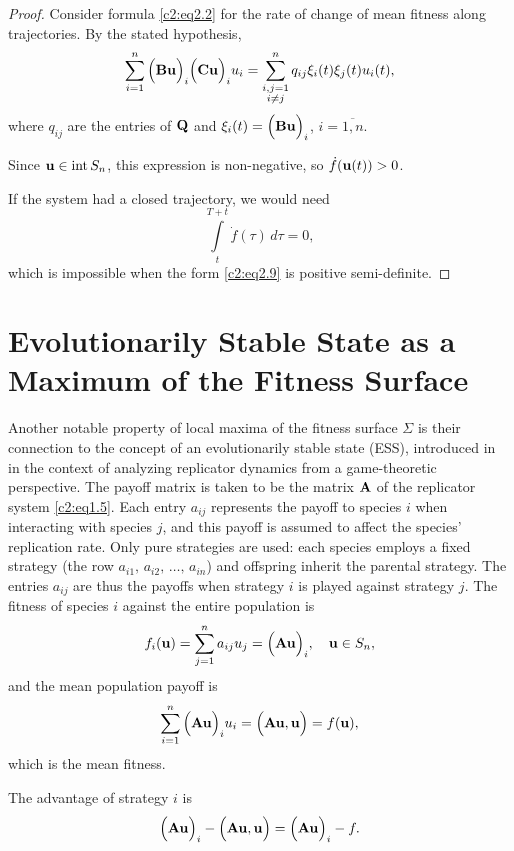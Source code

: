 \documentclass[12pt]{report}
\newcommand{\inside}{\mathrm{int}\,}
\theoremstyle{definition}
\theoremstyle{remark}
\begin{document}
\begin{proof}
	Consider formula \eqref{c2:eq2.2} for the rate of change of mean fitness along trajectories. By the stated hypothesis,
	\begin{equation}
		\label{c2:eq2.9}
		\sum\limits_{i = 1}^{n}\Big({\bf Bu}\Big)_{i}\Big({\bf Cu}\Big)_{i} u_i = \sum\limits_{\substack{i,j = 1 \\ i \neq j}}^{n}q_{ij}\xi_{i}(t)\xi_{j}(t)u_{i}(t),
	\end{equation}
	where $q_{ij}$ are the entries of ${\bf Q}$ and $\xi_{i}(t) = \Big({\bf Bu}\Big)_{i}$, $i = \overline{1, n}$.
	
	Since ${\bf u} \in \inside S_{n}$, this expression is non-negative, so $\dot{f}({\bf u}(t)) > 0$.
	
	If the system had a closed trajectory, we would need
	$$
	\int\limits_{t}^{T + t}\dot{f}(\tau)\,d\tau = 0,
	$$  
	which is impossible when the form \eqref{c2:eq2.9} is positive semi-definite. 
\end{proof} 

\clearpage

\section{Evolutionarily Stable State as a Maximum of the Fitness Surface}\label{c2:section:2.4}
Another notable property of local maxima of the fitness surface $\Sigma$ is their connection to the concept of an evolutionarily stable state (ESS), introduced in~\cite{c2:Maynard1982} in the context of analyzing replicator dynamics from a game-theoretic perspective. The payoff matrix is taken to be the matrix ${\bf A}$ of the replicator system \eqref{c2:eq1.5}. Each entry $a_{ij}$ represents the payoff to species $i$ when interacting with species $j$, and this payoff is assumed to affect the species' replication rate. Only pure strategies are used: each species employs a fixed strategy (the row $a_{i1},\, a_{i2},\, \ldots,\, a_{in}$) and offspring inherit the parental strategy. The entries $a_{ij}$ are thus the payoffs when strategy $i$ is played against strategy $j$. The fitness of species $i$ against the entire population is
$$
f_{i}({\bf u}) = \sum\limits_{j = 1}^{n}a_{ij}u_{j} = \Big({\bf Au}\Big)_{i}, \quad {\bf u} \in S_{n},
$$    
and the mean population payoff is
$$
\sum\limits_{i = 1}^{n}\Big({\bf Au}\Big)_{i}u_{i} = \Big({\bf Au, u}\Big) = f({\bf u}),
$$ 
which is the mean fitness.

The advantage of strategy $i$ is
$$
\Big({\bf Au}\Big)_{i} - \Big({\bf Au, u}\Big) = \Big({\bf Au}\Big)_{i} - f.
$$
\end{document}
